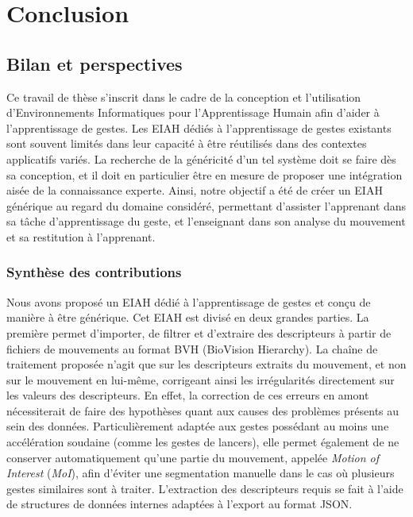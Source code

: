 \part{Conclusion}

\chapter{Bilan et perspectives}
Ce travail de thèse s'inscrit dans le cadre de la conception et l'utilisation d'Environnements Informatiques pour l'Apprentissage Humain afin d'aider à l'apprentissage de gestes. Les EIAH dédiés à l'apprentissage de gestes existants sont souvent limités dans leur capacité à être réutilisés dans des contextes applicatifs variés. La recherche de la généricité d'un tel système doit se faire dès sa conception, et il doit en particulier être en mesure de proposer une intégration aisée de la connaissance experte. Ainsi, notre objectif a été de créer un EIAH générique au regard du domaine considéré, permettant d'assister l'apprenant dans sa tâche d'apprentissage du geste, et l'enseignant dans son analyse du mouvement et sa restitution à l'apprenant.

\section{Synthèse des contributions}
Nous avons proposé un EIAH dédié à l'apprentissage de gestes et conçu de manière à être générique. Cet EIAH est divisé en deux grandes parties. La première permet d'importer, de filtrer et d'extraire des descripteurs à partir de fichiers de mouvements au format BVH (BioVision Hierarchy). La chaîne de traitement proposée n'agit que sur les descripteurs extraits du mouvement, et non sur le mouvement en lui-même, corrigeant ainsi les irrégularités directement sur les valeurs des descripteurs. En effet, la correction de ces erreurs en amont nécessiterait de faire des hypothèses quant aux causes des problèmes présents au sein des données. Particulièrement adaptée aux gestes possédant au moins une accélération soudaine (comme les gestes de lancers), elle permet également de ne conserver automatiquement qu'une partie du mouvement, appelée \textit{Motion of Interest} (\textit{MoI}), afin d'éviter une segmentation manuelle dans le cas où plusieurs gestes similaires sont à traiter. L'extraction des descripteurs requis se fait à l'aide de structures de données internes adaptées à l'export au format JSON.

